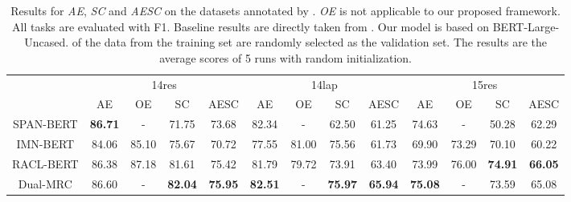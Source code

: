\documentclass[letterpaper]{article} \usepackage{aaai21}  \usepackage{times}  \usepackage{helvet} \usepackage{courier}  \usepackage[hyphens]{url}  \usepackage{graphicx} \urlstyle{rm} \def\UrlFont{\rm}  \usepackage{natbib}  \usepackage{caption}
\begin{document}
\begin{table*}
    \centering
    \begin{tabular}{c|cccc|cccc|cccc}
    \hline
             & \multicolumn{4}{c|}{14res}         & \multicolumn{4}{c|}{14lap}         & \multicolumn{4}{c}{15res}          \\ \cline{2-13} 
             & AE    & OE    & SC    & AESC       & AE    & OE    & SC    & AESC       & AE    & OE    & SC    & AESC       \\ \hline
    SPAN-BERT    & \textbf{86.71} & -     & 71.75 & 73.68      & 82.34 & -     & 62.50 & 61.25      & 74.63 & -     & 50.28 & 62.29      \\
    IMN-BERT      & 84.06 & 85.10 & 75.67 & 70.72      & 77.55 & 81.00 & 75.56 & 61.73      & 69.90 & 73.29 & 70.10 & 60.22      \\
    RACL-BERT     & 86.38 & 87.18 & 81.61 & 75.42      & 81.79 & 79.72 & 73.91 & 63.40      & 73.99 & 76.00 & \textbf{74.91} & \textbf{66.05}      \\ \hline
    Dual-MRC & 86.60 & -     & \textbf{82.04}     & \textbf{75.95} & \textbf{82.51}     & -     & \textbf{75.97}     & \textbf{65.94} & \textbf{75.08}     & -     & 73.59    & 65.08 \\ \hline
    \end{tabular} 
    \caption{Results for \emph{AE}, \emph{SC} and \emph{AESC} on the datasets annotated by \cite{DBLP:conf/aaai/WangPDX17}. 
    \emph{OE} is not applicable to our proposed framework. All tasks are evaluated with F1. 
    Baseline results are directly taken from \cite{chen-qian-2020-relation}. Our model is based on BERT-Large-Uncased. 
     of the data from the training set are randomly selected as the validation set. The results are the average scores of 5 runs with random initialization.}
    \label{exp_1}
\end{table*} 
\end{document}
